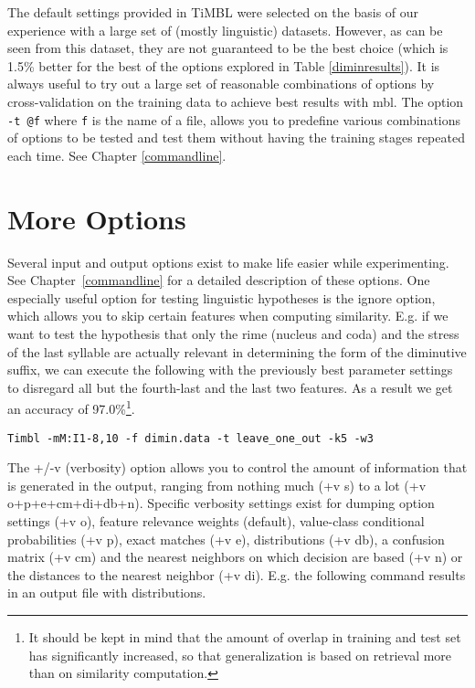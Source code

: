 \documentclass{report}
\begin{document}
The default settings provided in TiMBL were selected on the basis of
our experience with a large set of (mostly linguistic)
datasets. However, as can be seen from this dataset, they are not
guaranteed to be the best choice (which is 1.5\% better for the best
of the options explored in Table \ref{diminresults}). It is always
useful to try out a large set of reasonable combinations of options by
cross-validation on the training data to achieve best results with
{\sc mbl}. The option {\tt -t @f} where {\tt f} is the name of a file,
allows you to predefine various combinations of options to be tested
and test them without having the training stages repeated each
time. See Chapter \ref{commandline}.

\section{More Options}

Several input and output options exist to make life easier while
experimenting. See Chapter~\ref{commandline} for a detailed
description of these options. One especially useful option for testing
linguistic hypotheses is the ignore option, which allows you to skip
certain features when computing similarity. E.g. if we want to test
the hypothesis that only the rime (nucleus and coda) and the stress of
the last syllable are actually relevant in determining the form of the
diminutive suffix, we can execute the following with the previously
best parameter settings to disregard all but the fourth-last and the
last two features. As a result we get an accuracy of
97.0\%\footnote{It should be kept in mind that the amount of overlap
in training and test set has significantly increased, so that
generalization is based on retrieval more than on similarity
computation.}. 

{\small
\begin{verbatim}
Timbl -mM:I1-8,10 -f dimin.data -t leave_one_out -k5 -w3
\end{verbatim}
}


The {\sc +/-v} (verbosity) option allows you to control the amount of
information that is generated in the output, ranging from nothing much
({\sc +v s}) to a lot ({\sc +v o+p+e+cm+di+db+n}). Specific verbosity
settings exist for dumping option settings ({\sc +v o}), feature
relevance weights (default), value-class conditional probabilities
({\sc +v p}), exact matches ({\sc +v e}), distributions ({\sc +v db}),
a confusion matrix ({\sc +v cm}) and the nearest neighbors on which
decision are based ({\sc +v n}) or the distances to the nearest
neighbor ({\sc +v di}). E.g. the following command results in an
output file with distributions.
\end{document}
